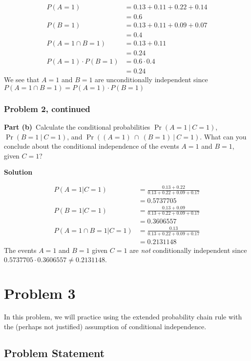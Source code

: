 \documentclass[12pt]{article}
\theoremstyle{definition}
\begin{document}
\begin{align*}
P(A = 1) &= 0.13 + 0.11 + 0.22 + 0.14\\
&= 0.6\\
P(B = 1) &= 0.13 + 0.11 + 0.09 + 0.07\\
&= 0.4\\
P(A = 1 \cap B = 1) &= 0.13 + 0.11\\
&= 0.24\\
P(A = 1) \cdot P(B = 1) &= 0.6 \cdot 0.4\\
&= 0.24
\end{align*}
We see that $A = 1$ and $B = 1$ are unconditionally independent since $P(A = 1 \cap B = 1) = P(A = 1) \cdot P(B = 1)$

\newpage
\subsubsection*{Problem 2, continued}
\noindent
{\bf Part (b)}\ Calculate the conditional probabilities $\Pr(A = 1\ |\ C = 1)$,\\ $\Pr(B = 1\ |\ C = 1)$, and $\Pr( (A = 1)\ \cap\ (B=1)\ |\ C = 1 )$. What can you conclude about the conditional independence of the events $A = 1$ and $B = 1$, given $C = 1$?

\bigskip
\noindent
{\bf Solution}

\begin{align*}
P(A=1|C=1) &= \frac{0.13 + 0.22}{0.13 + 0.22 + 0.09 + 0.17}\\
&= 0.5737705\\
P(B=1|C=1) &= \frac{0.13 + 0.09}{0.13 + 0.22 + 0.09 + 0.17}\\
&= 0.3606557\\
P(A=1 \cap B=1|C=1) &= \frac{0.13}{0.13 + 0.22 + 0.09 + 0.17}\\
&= 0.2131148
\end{align*}
The events $A = 1$ and $B = 1$ given $C = 1$ are \textit{not} conditionally independent since $0.5737705 \cdot 0.3606557 \neq 0.2131148$.

\newpage
\section*{Problem 3}

In this problem, we will practice using the extended probability chain rule with the (perhaps not justified) assumption of conditional independence.

\subsection*{Problem Statement}
\end{document}
